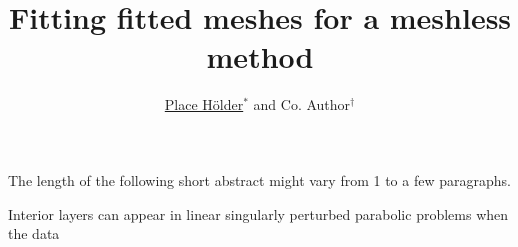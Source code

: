 \documentclass{layers17}
\begin{document}

\title{Fitting fitted meshes for a meshless method }
\author{\underline{Place H\"older$^*$} and Co. Author$^{\dagger}$}
\def\PresentingAuthor{P.\ H\"older}


\address{$^*$\
School of Mathematical Sciences,
Dublin City University.\\
E-mail: \texttt{Your.Name@DCU.ie}
\
\\
$^{\dagger}$School of Mathematics, Statistics, and Applied Mathematics, 
NUI Galway.\\
E-mail: \texttt{Co.Author@NUIGalway.ie}
}




\received{} \revised{} \noaccepted{}


%
The length of the following short abstract might vary from 1 to a few paragraphs.

\begin{shortabstract}


Interior layers can appear in linear singularly perturbed parabolic problems when the data


\end{shortabstract}








\end{document}
